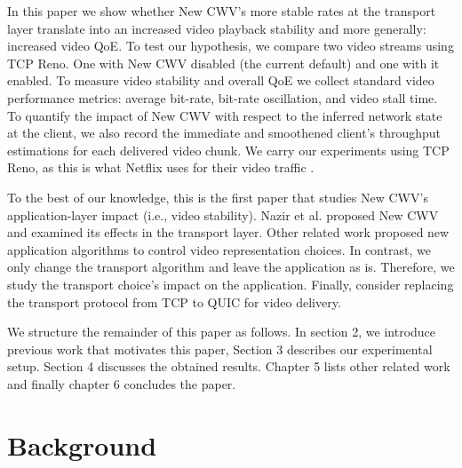 \documentclass[10pt,sigconf]{acmart}
\begin{document}
In this paper we show whether New CWV's more stable rates at the transport layer translate into an increased video playback stability and more generally: increased video QoE. To test our hypothesis, we compare two video streams using TCP Reno. One with New CWV disabled (the current default) and one with it enabled. To measure video stability and overall QoE we collect standard video performance metrics: average bit-rate, bit-rate oscillation, and video stall time. To quantify the impact of New CWV with respect to the inferred network state at the client, we also record the immediate and smoothened client's throughput estimations for each delivered video chunk. We carry our experiments using TCP Reno, as this is what Netflix uses for their video traffic \cite{Mishra-2019-the-great-internet-tcp-congestion-control-census}.


To the best of our knowledge, this is the first paper that studies New CWV's application-layer impact (i.e., video stability). Nazir et al. \cite{Nazir-2014-performance-evaluation-congestion-window-validation-dash-newcwv} proposed New CWV and examined its effects in the transport layer. Other related work proposed new application algorithms to control video representation choices. In contrast, we only change the transport algorithm and leave the application as is. Therefore, we study the transport choice's impact on the application. Finally, \cite{Bhat-2017-not-so-quic} consider replacing the transport protocol from TCP to QUIC for video delivery. 


We structure the remainder of this paper as follows. In section 2, we introduce previous work that motivates this paper, Section 3 describes our experimental setup. Section 4 discusses the obtained results. Chapter 5 lists other related work and finally chapter 6 concludes the paper.

\section{Background}
\label{sec:background}
\end{document}
